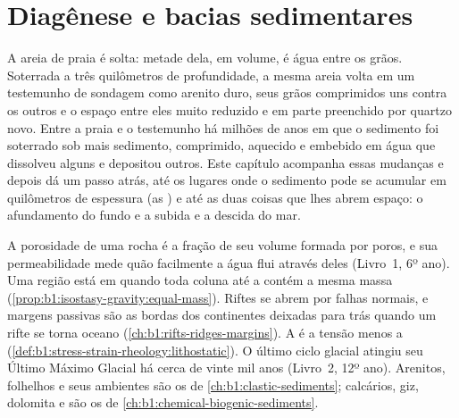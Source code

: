 \chapter{Diagênese e bacias sedimentares}\label{ch:b1:diagenesis-basins}

A areia de praia é solta: metade dela, em volume, é água entre os grãos. Soterrada a três
quilômetros de profundidade, a mesma areia volta em um testemunho de sondagem como arenito
duro, seus grãos comprimidos uns contra os outros e o espaço entre eles muito reduzido e
em parte preenchido por quartzo novo. Entre a praia e o testemunho há milhões de anos em
que o sedimento foi soterrado sob mais sedimento, comprimido, aquecido e embebido em água
que dissolveu alguns  e depositou outros. Este capítulo acompanha essas mudanças e
depois dá um passo atrás, até os lugares onde o sedimento pode se acumular em quilômetros de
espessura (as ) e até as duas coisas que lhes abrem espaço: o afundamento
do fundo e a subida e a descida do mar.

\begin{recall}
A porosidade de uma rocha é a fração de seu volume formada por poros, e sua permeabilidade
mede quão facilmente a água flui através deles (Livro~1, 6º ano). Uma região está em
 quando toda coluna até a  contém a mesma massa
(\cref{prop:b1:isostasy-gravity:equal-mass}). Riftes se abrem por falhas normais, e margens
passivas são as bordas dos continentes deixadas para trás quando um rifte se torna oceano
(\cref{ch:b1:rifts-ridges-margins}). A  é a tensão menos a  (\cref{def:b1:stress-strain-rheology:lithostatic}). O último ciclo glacial atingiu
seu Último Máximo Glacial há cerca de vinte mil anos (Livro~2, 12º ano). Arenitos, folhelhos
e seus ambientes são os de \cref{ch:b1:clastic-sediments}; calcários, giz, dolomita e
 são os de \cref{ch:b1:chemical-biogenic-sediments}.
\end{recall}

